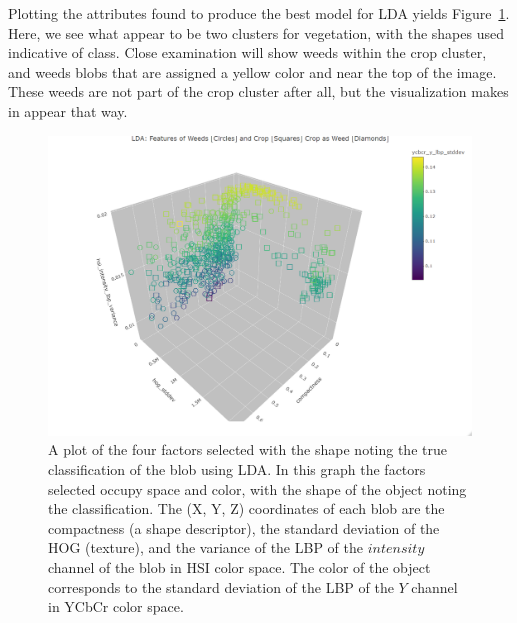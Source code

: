 \documentclass[letterpaper]{report}
\begin{document}
 

Plotting the attributes found to produce the best model for LDA yields Figure~\ref{fig:factors}. Here, we see what appear to be two clusters for vegetation, with the shapes used indicative of class.  Close examination will show weeds within the crop cluster, and weeds blobs that are assigned a yellow color and near the top of the image. These weeds are not part of the crop cluster after all, but the visualization makes in appear that way.

 \begin{figure}[H]
	\centering
	\includegraphics[width=0.9\linewidth]{./figures/plot-factors.png}
	\caption[Factors selected for discrimination]{A plot of the four factors selected with the shape noting the true classification of the blob using LDA. In this graph the factors selected occupy space and color, with the shape of the object noting the classification. The (X, Y, Z) coordinates of each blob are the compactness (a shape descriptor), the standard deviation of the HOG (texture), and the variance of the LBP of the $intensity$ channel of the blob in HSI color space. The color of the object corresponds to the standard deviation of the LBP of the $Y$ channel in YCbCr color space.}
	\label{fig:factors}
\end{figure}
\end{document}

